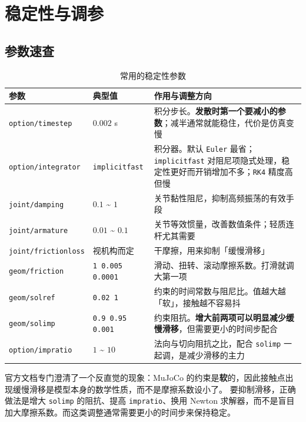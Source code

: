 \section{稳定性与调参}

\subsection{参数速查}

\begin{table}[H]
	\centering
	\caption{常用的稳定性参数}
	\label{tab:Debug:参数}
	\footnotesize
	\begin{tabular}{>{\raggedright\arraybackslash}p{2.9cm}>{\raggedright\arraybackslash}p{2.4cm}>{\raggedright\arraybackslash}p{8.9cm}}
		\hline
		参数 & 典型值 & 作用与调整方向 \\
		\hline
		\texttt{option/timestep} & $0.002$ s & 积分步长。\textbf{发散时第一个要减小的参数}；减半通常就能稳住，代价是仿真变慢 \\
		\texttt{option/integrator} & \texttt{implicitfast} & 积分器。默认 \texttt{Euler} 最省；\texttt{implicitfast} 对阻尼项隐式处理，稳定性更好而开销增加不多；\texttt{RK4} 精度高但慢 \\
		\texttt{joint/damping} & $0.1$ \textasciitilde{} $1$ & 关节黏性阻尼，抑制高频振荡的有效手段 \\
		\texttt{joint/armature} & $0.01$ \textasciitilde{} $0.1$ & 关节等效惯量，改善数值条件；轻质连杆尤其需要 \\
		\texttt{joint/frictionloss} & 视机构而定 & 干摩擦，用来抑制「缓慢滑移」 \\
		\texttt{geom/friction} & \texttt{1 0.005 0.0001} & 滑动、扭转、滚动摩擦系数。打滑就调大第一项 \\
		\texttt{geom/solref} & \texttt{0.02 1} & 约束的时间常数与阻尼比。值越大越「软」，接触越不容易抖 \\
		\texttt{geom/solimp} & \texttt{0.9 0.95 0.001} & 约束阻抗。\textbf{增大前两项可以明显减少缓慢滑移}，但需要更小的时间步配合 \\
		\texttt{option/impratio} & $1$ \textasciitilde{} $10$ & 法向与切向阻抗之比，配合 \texttt{solimp} 一起调，是减少滑移的主力 \\
		\hline
	\end{tabular}
\end{table}

\begin{warnbox}[「滑移」不是摩擦不够]
	官方文档专门澄清了一个反直觉的现象：MuJoCo 的约束是\textbf{软}的，因此接触点出现缓慢滑移是模型本身的数学性质，而不是摩擦系数设小了。
	要抑制滑移，正确做法是增大 \texttt{solimp} 的阻抗、提高 \texttt{impratio}、换用 Newton 求解器，而不是盲目加大摩擦系数。而这类调整通常需要更小的时间步来保持稳定。
\end{warnbox}

